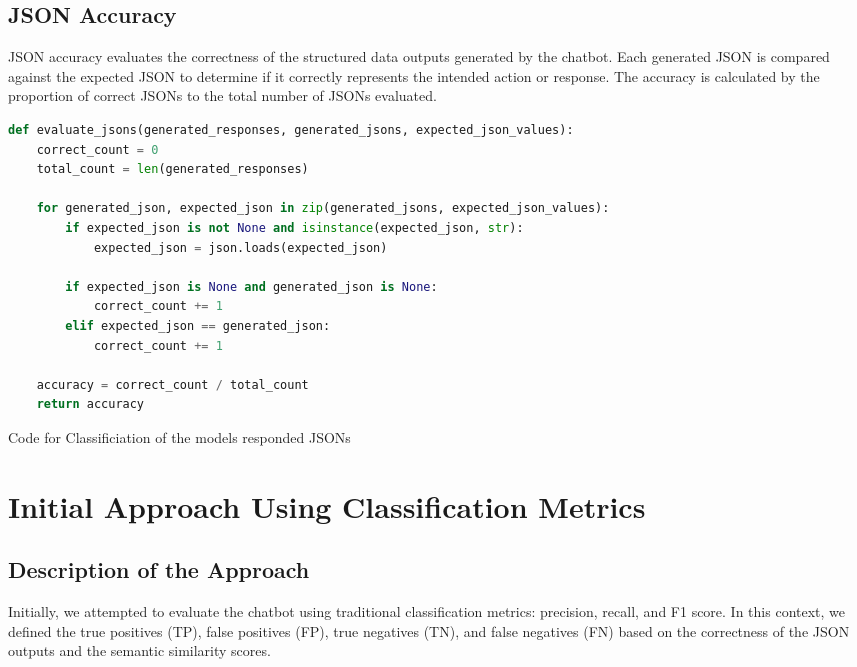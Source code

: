 \subsection{JSON Accuracy}

JSON accuracy evaluates the correctness of the structured data outputs generated by the chatbot. Each generated JSON is compared against the expected JSON to determine if it correctly represents the intended action or response. The accuracy is calculated by the proportion of correct JSONs to the total number of JSONs evaluated.

\begin{Listing}
    \begin{lstlisting}[language=Python]
def evaluate_jsons(generated_responses, generated_jsons, expected_json_values):
    correct_count = 0
    total_count = len(generated_responses)

    for generated_json, expected_json in zip(generated_jsons, expected_json_values):
        if expected_json is not None and isinstance(expected_json, str):
            expected_json = json.loads(expected_json)
        
        if expected_json is None and generated_json is None:
            correct_count += 1
        elif expected_json == generated_json:
            correct_count += 1

    accuracy = correct_count / total_count
    return accuracy
  \end{lstlisting}
    \caption{Code for Classificiation of the models responded JSONs}
    \label{lst:evalMetrics1}
\end{Listing}

\section{Initial Approach Using Classification Metrics}

\subsection{Description of the Approach}

Initially, we attempted to evaluate the chatbot using traditional classification metrics: precision, recall, and F1 score. In this context, we defined the true positives (TP), false positives (FP), true negatives (TN), and false negatives (FN) based on the correctness of the JSON outputs and the semantic similarity scores.

\begin{lstlisting}[language=Python, caption=Classification Metrics]

\end{lstlisting}

